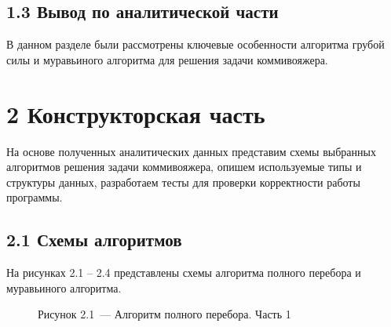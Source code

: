 \documentclass[12pt, a4paper]{report}
\begin{document}
	\section*{1.3 Вывод по аналитической части}
	В данном разделе были рассмотрены ключевые особенности алгоритма грубой силы и муравьиного алгоритма для решения задачи коммивояжера.
	
	\newpage
	\chapter*{2 Конструкторская часть}
	
	На основе полученных аналитических данных представим схемы выбранных алгоритмов решения задачи коммивояжера, опишем используемые типы и структуры данных, разработаем тесты для проверки корректности работы программы.
	
	\section*{2.1 Схемы алгоритмов}
	
	На рисунках 2.1 -- 2.4 представлены схемы алгоритма полного перебора и муравьиного алгоритма.
	
	\begin{figure}[H]
		\caption*{Рисунок 2.1~--- Алгоритм полного перебора. Часть 1}
	\end{figure}
	
\end{document}
